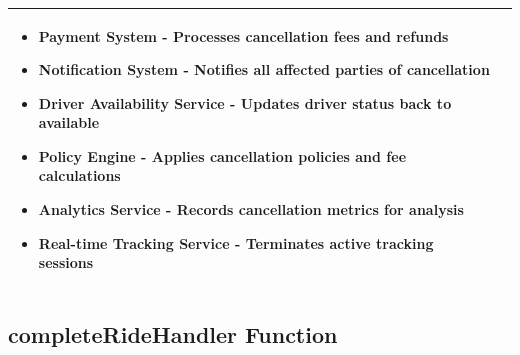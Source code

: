 \documentclass[11pt,a4paper]{article}
\begin{document}
\begin{longtable}{|p{4cm}|p{12cm}|}
\begin{itemize}[nosep]
\item Payment System - Processes cancellation fees and refunds
\item Notification System - Notifies all affected parties of cancellation
\item Driver Availability Service - Updates driver status back to available
\item Policy Engine - Applies cancellation policies and fee calculations
\item Analytics Service - Records cancellation metrics for analysis
\item Real-time Tracking Service - Terminates active tracking sessions
\end{itemize} \\
\hline
\end{longtable}

\subsection{completeRideHandler Function}
\end{document}
